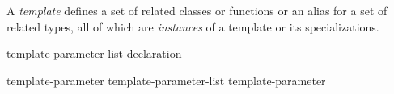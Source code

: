 
\p A \textit{template} defines a set of related classes or functions or an alias
for a set of related types, all of which are \textit{instances} of a template
or its specializations.

\begin{grammar}
  \br
   \terminal{<} template-parameter-list \terminal{>} declaration\br

  \br
    template-parameter\br
    template-parameter-list \terminal{,} template-parameter
\end{grammar}

